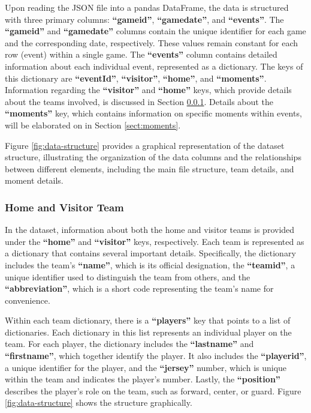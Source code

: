 Upon reading the JSON file into a pandas DataFrame, the data is structured with three primary columns: \textbf{``gameid''}, \textbf{``gamedate''}, and \textbf{``events''}. The \textbf{``gameid''} and \textbf{``gamedate''} columns contain the unique identifier for each game and the corresponding date, respectively. These values remain constant for each row (event) within a single game. The \textbf{``events''} column contains detailed information about each individual event, represented as a dictionary. The keys of this dictionary are \textbf{``eventId''}, \textbf{``visitor''}, \textbf{``home''}, and \textbf{``moments''}. Information regarding the \textbf{``visitor''} and \textbf{``home''} keys, which provide details about the teams involved, is discussed in Section \ref{sect:teams}. Details about the \textbf{``moments''} key, which contains information on specific moments within events, will be elaborated on in Section \ref{sect:moments}.

Figure \ref{fig:data-structure} provides a graphical representation of the dataset structure, illustrating the organization of the data columns and the relationships between different elements, including the main file structure, team details, and moment details.

\subsubsection{Home and Visitor Team}
\label{sect:teams}

In the dataset, information about both the home and visitor teams is provided under the \textbf{``home''} and \textbf{``visitor''} keys, respectively. Each team is represented as a dictionary that contains several important details. Specifically, the dictionary includes the team's \textbf{``name''}, which is its official designation, the \textbf{``teamid''}, a unique identifier used to distinguish the team from others, and the \textbf{``abbreviation''}, which is a short code representing the team’s name for convenience.

Within each team dictionary, there is a \textbf{``players''} key that points to a list of dictionaries. Each dictionary in this list represents an individual player on the team. For each player, the dictionary includes the \textbf{``lastname''} and \textbf{``firstname''}, which together identify the player. It also includes the \textbf{``playerid''}, a unique identifier for the player, and the \textbf{``jersey''} number, which is unique within the team and indicates the player's number. Lastly, the \textbf{``position''} describes the player’s role on the team, such as forward, center, or guard. Figure \ref{fig:data-structure} shows the structure graphically. 

